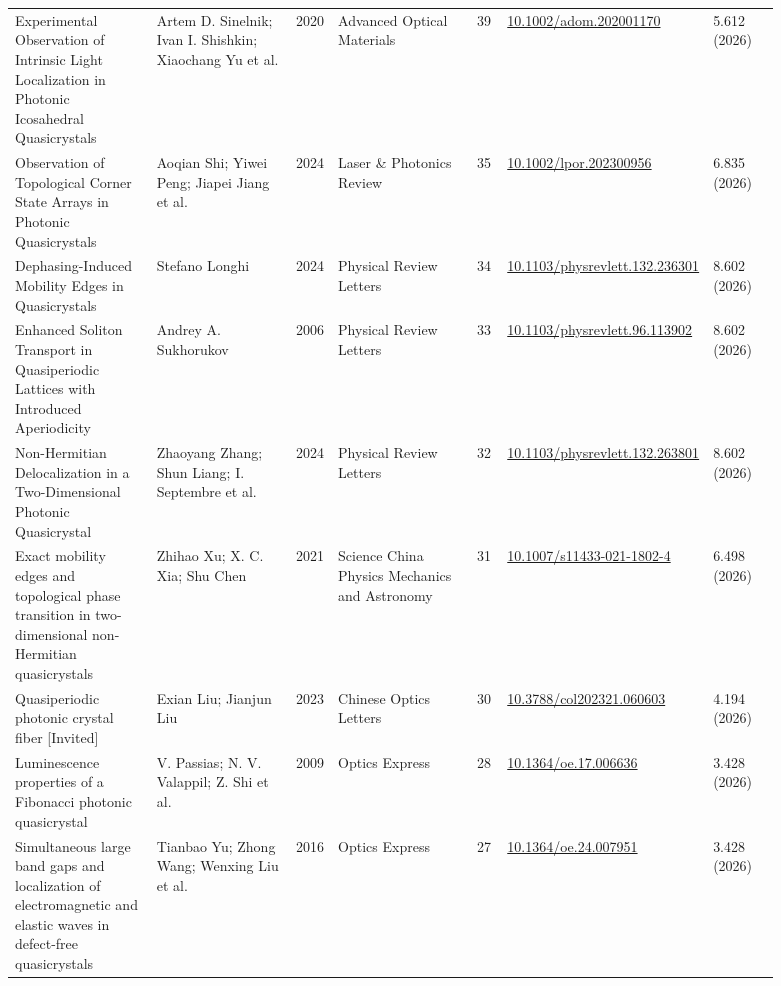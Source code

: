 \documentclass[10pt,a4paper]{article}
\begin{document}
{\begin{longtable}{p{0.192\linewidth}p{0.192\linewidth}p{0.043\linewidth}p{0.192\linewidth}p{0.043\linewidth}p{0.132\linewidth}p{0.096\linewidth}}
Experimental Observation of Intrinsic Light Localization in Photonic Icosahedral Quasicrystals & Artem D. Sinelnik; Ivan I. Shishkin; Xiaochang Yu et al. & 2020 & Advanced Optical Materials & 39 & \href{https://doi.org/10.1002/adom.202001170}{10.1002/adom.202001170} & 5.612 (2026) \\
Observation of Topological Corner State Arrays in Photonic Quasicrystals & Aoqian Shi; Yiwei Peng; Jiapei Jiang et al. & 2024 & Laser \& Photonics Review & 35 & \href{https://doi.org/10.1002/lpor.202300956}{10.1002/lpor.202300956} & 6.835 (2026) \\
Dephasing-Induced Mobility Edges in Quasicrystals & Stefano Longhi & 2024 & Physical Review Letters & 34 & \href{https://doi.org/10.1103/physrevlett.132.236301}{10.1103/physrevlett.132.236301} & 8.602 (2026) \\
Enhanced Soliton Transport in Quasiperiodic Lattices with Introduced Aperiodicity & Andrey A. Sukhorukov & 2006 & Physical Review Letters & 33 & \href{https://doi.org/10.1103/physrevlett.96.113902}{10.1103/physrevlett.96.113902} & 8.602 (2026) \\
Non-Hermitian Delocalization in a Two-Dimensional Photonic Quasicrystal & Zhaoyang Zhang; Shun Liang; I. Septembre et al. & 2024 & Physical Review Letters & 32 & \href{https://doi.org/10.1103/physrevlett.132.263801}{10.1103/physrevlett.132.263801} & 8.602 (2026) \\
Exact mobility edges and topological phase transition in two-dimensional non-Hermitian quasicrystals & Zhihao Xu; X. C. Xia; Shu Chen & 2021 & Science China Physics Mechanics and Astronomy & 31 & \href{https://doi.org/10.1007/s11433-021-1802-4}{10.1007/s11433-021-1802-4} & 6.498 (2026) \\
Quasiperiodic photonic crystal fiber {[}Invited{]} & Exian Liu; Jianjun Liu & 2023 & Chinese Optics Letters & 30 & \href{https://doi.org/10.3788/col202321.060603}{10.3788/col202321.060603} & 4.194 (2026) \\
Luminescence properties of a Fibonacci photonic quasicrystal & V. Passias; N. V. Valappil; Z. Shi et al. & 2009 & Optics Express & 28 & \href{https://doi.org/10.1364/oe.17.006636}{10.1364/oe.17.006636} & 3.428 (2026) \\
Simultaneous large band gaps and localization of electromagnetic and elastic waves in defect-free quasicrystals & Tianbao Yu; Zhong Wang; Wenxing Liu et al. & 2016 & Optics Express & 27 & \href{https://doi.org/10.1364/oe.24.007951}{10.1364/oe.24.007951} & 3.428 (2026) \\

\end{longtable}}
\end{document}
